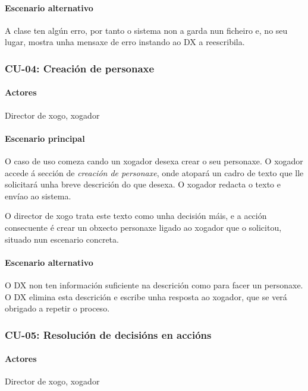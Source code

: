 \paragraph{Escenario alternativo}
A clase ten algún erro, por tanto o sistema non a garda nun ficheiro e, no seu
lugar, mostra unha mensaxe de erro instando ao DX a reescribila.

\subsubsection{CU-04: Creación de personaxe}
\paragraph{Actores}
Director de xogo, xogador
\paragraph{Escenario principal}
O caso de uso comeza cando un xogador desexa crear o seu personaxe. O xogador
accede á sección de {\it creación de personaxe}, onde atopará un cadro de texto
que lle solicitará unha breve descrición do que desexa. O xogador redacta o
texto e envíao ao sistema.
\par
O director de xogo trata este texto como unha decisión máis, e a acción
consecuente é crear un obxecto personaxe ligado ao xogador que o solicitou,
situado nun escenario concreta.

\paragraph{Escenario alternativo}
O DX non ten información suficiente na descrición como para facer un personaxe.
O DX elimina esta descrición e escribe unha resposta ao xogador, que se verá
obrigado a repetir o proceso.

\subsubsection{CU-05: Resolución de decisións en accións}
\paragraph{Actores}
Director de xogo, xogador
